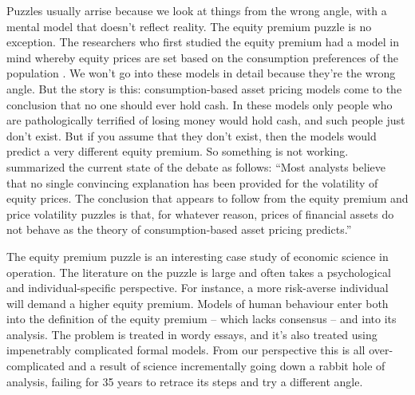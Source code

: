 Puzzles usually arrise because we look at things from the wrong angle, with a mental model that doesn't reflect reality. The equity premium puzzle is no exception. The researchers who first studied the equity premium had a model in mind whereby equity prices are set based on the consumption preferences of the population \cite{MehraPrescott1985}. 
We won't go into these models in detail because they're the wrong angle. But the story is this: consumption-based asset pricing models come to the conclusion that no one should ever hold cash. In these models only people who are pathologically terrified of losing money would hold cash, and such people just don't exist. But if you assume that they don't exist, then the models would predict a very different equity premium. So something is not working.
\cite{LeRoy2016} summarized the current state of the debate as follows: ``Most analysts believe that no single convincing explanation has been provided for the volatility of equity prices. The conclusion that appears to follow from the equity premium and price volatility puzzles is that, for whatever reason, prices of financial assets do not behave as the theory of consumption-based asset pricing predicts.''

The equity premium puzzle is an interesting case study of economic science in operation.  The literature on the puzzle is large and often takes a psychological and individual-specific perspective. For instance, a more risk-averse individual will demand a higher equity premium. Models of human behaviour enter both into the definition of the equity premium -- which lacks consensus \cite{Fernandez2009} -- and into its analysis. The problem is treated in wordy essays, and it's also treated using impenetrably complicated formal models. From our perspective this is all over-complicated and a result of science incrementally going down a rabbit hole of analysis, failing for 35 years to retrace its steps and try a different angle.

